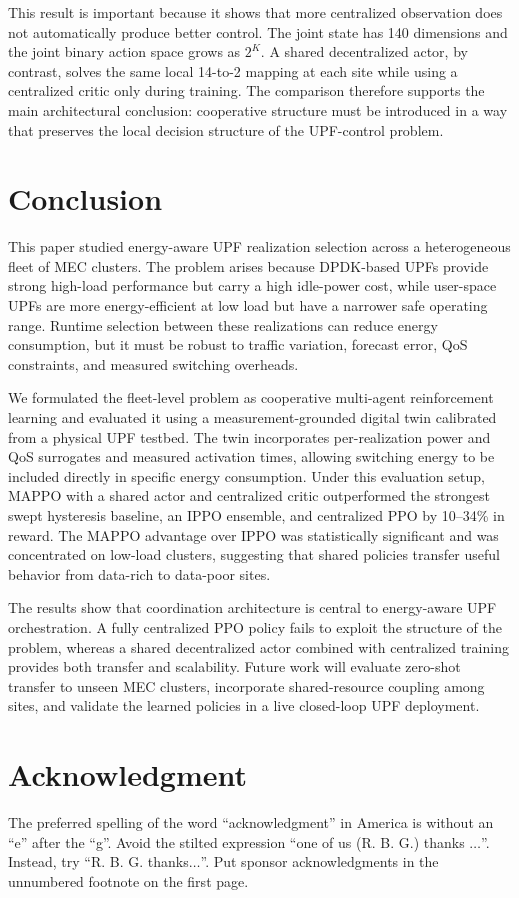 \documentclass[10pt,conference,letterpaper]{IEEEtran}
\begin{document}
This result is important because it shows that more centralized observation does
not automatically produce better control. The joint state has 140 dimensions and
the joint binary action space grows as $2^K$. A shared decentralized actor, by
contrast, solves the same local 14-to-2 mapping at each site while using a
centralized critic only during training. The comparison therefore supports the
main architectural conclusion: cooperative structure must be introduced in a way
that preserves the local decision structure of the UPF-control problem.


\section{Conclusion}
\label{sec:conclusion}
This paper studied energy-aware UPF realization selection across a heterogeneous
fleet of MEC clusters. The problem arises because DPDK-based UPFs provide strong
high-load performance but carry a high idle-power cost, while user-space UPFs
are more energy-efficient at low load but have a narrower safe operating range.
Runtime selection between these realizations can reduce energy consumption, but
it must be robust to traffic variation, forecast error, QoS constraints, and
measured switching overheads.

We formulated the fleet-level problem as cooperative multi-agent reinforcement
learning and evaluated it using a measurement-grounded digital twin calibrated
from a physical UPF testbed. The twin incorporates per-realization power and QoS
surrogates and measured activation times, allowing switching energy to be
included directly in specific energy consumption. Under this evaluation setup,
MAPPO with a shared actor and centralized critic outperformed the strongest
swept hysteresis baseline, an IPPO ensemble, and centralized PPO by 10--34\% in
reward. The MAPPO advantage over IPPO was statistically significant and was
concentrated on low-load clusters, suggesting that shared policies transfer
useful behavior from data-rich to data-poor sites.

The results show that coordination architecture is central to energy-aware UPF
orchestration. A fully centralized PPO policy fails to exploit the structure of
the problem, whereas a shared decentralized actor combined with centralized
training provides both transfer and scalability. Future work will evaluate
zero-shot transfer to unseen MEC clusters, incorporate shared-resource coupling
among sites, and validate the learned policies in a live closed-loop UPF
deployment.


\section*{Acknowledgment}

The preferred spelling of the word ``acknowledgment'' in America is without 
an ``e'' after the ``g''. Avoid the stilted expression ``one of us (R. B. 
G.) thanks $\ldots$''. Instead, try ``R. B. G. thanks$\ldots$''. Put sponsor 
acknowledgments in the unnumbered footnote on the first page.




\end{document}
